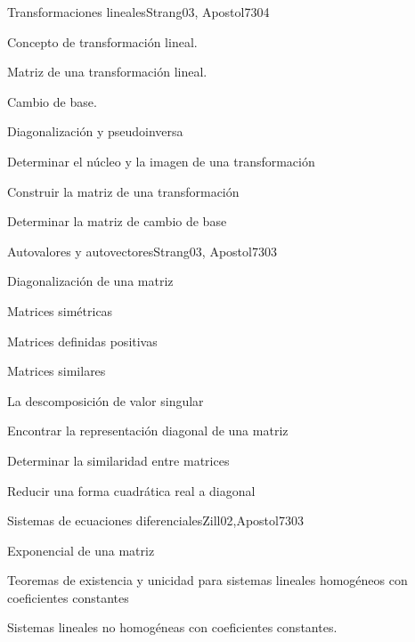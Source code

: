 \begin{syllabus}
\begin{unit}{Transformaciones lineales}{Strang03, Apostol73}{0}{4}
\begin{topics}
      \item Concepto de transformación lineal.
      \item Matriz de una transformación lineal.
      \item Cambio de base.
      \item Diagonalización y pseudoinversa
   \end{topics}

   \begin{learningoutcomes}
      \item Determinar el núcleo y la imagen de una transformación
      \item Construir la matriz de una transformación
      \item Determinar la matriz de cambio de base
      \end{learningoutcomes}
\end{unit}

\begin{unit}{Autovalores y autovectores}{Strang03, Apostol73}{0}{3}
\begin{topics}
      \item Diagonalización de una matriz
      \item Matrices simétricas
      \item Matrices definidas positivas
      \item Matrices similares
      \item La descomposición de valor singular
  \end{topics}

   \begin{learningoutcomes}
      \item Encontrar la representación diagonal de una matriz
      \item Determinar la similaridad entre matrices
      \item Reducir una forma cuadrática real a diagonal
   \end{learningoutcomes}
\end{unit}

\begin{unit}{Sistemas de ecuaciones diferenciales}{Zill02,Apostol73}{0}{3}
\begin{topics}
      \item Exponencial de una matriz
      \item Teoremas de existencia y unicidad para sistemas lineales homogéneos con coeficientes constantes
      \item Sistemas lineales no homogéneas con coeficientes constantes.
    \end{topics}


\end{unit}
\end{syllabus}
